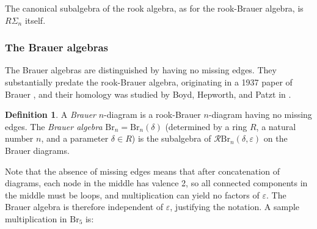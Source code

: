 \documentclass[12pt]{amsart}
\theoremstyle{plain}
\theoremstyle{definition} \newtheorem{definition}[theorem]{Definition}
\theoremstyle{plain}
\theoremstyle{plain} \newtheorem{proposition}[theorem]{Proposition}
\theoremstyle{plain} \newtheorem{conjecture}[theorem]{Conjecture}
\theoremstyle{plain} \newtheorem{corollary}[theorem]{Corollary}
\theoremstyle{remark} \newtheorem{claim}[theorem]{Claim}
\theoremstyle{remark} \newtheorem{remark}[theorem]{Remark}
\theoremstyle{remark} \newtheorem{example}[theorem]{Example}
\theoremstyle{remark} \newtheorem{comment}[theorem]{Comment}
\theoremstyle{definition} \newtheorem{question}[theorem]{Question}
\newcommand{\rook}{\mathcal{R}}
\newcommand{\Brauer}{\mathrm{Br}}
\newcommand{\maxTpt}{canonical}
\begin{document}
The {\maxTpt} subalgebra of the rook algebra, as for the rook-Brauer algebra, is $R \Sigma_n$ itself.

\subsubsection{The Brauer algebras}

The Brauer algebras are distinguished by having no missing edges. They substantially predate the rook-Brauer algebra, originating in a 1937 paper of Brauer \cite{Brauer}, and their homology was studied by Boyd, Hepworth, and Patzt in \cite{BHP}.

\begin{definition} \label{defBrauer} A \emph{Brauer} $n$-diagram is a rook-Brauer $n$-diagram having no missing edges. The \emph{Brauer algebra} $\Brauer_n = \Brauer_n(\delta)$ (determined by a ring $R$, a natural number $n$, and a parameter $\delta \in R$) is the subalgebra of $\rook \Brauer_n(\delta, \varepsilon)$ on the Brauer diagrams. \end{definition}

Note that the absence of missing edges means that after concatenation of diagrams, each node in the middle has valence 2, so all connected components in the middle must be loops, and multiplication can yield no factors of $\varepsilon$. The Brauer algebra is therefore independent of $\varepsilon$, justifying the notation. A sample multiplication in $\Brauer_5$ is:
\end{document}
